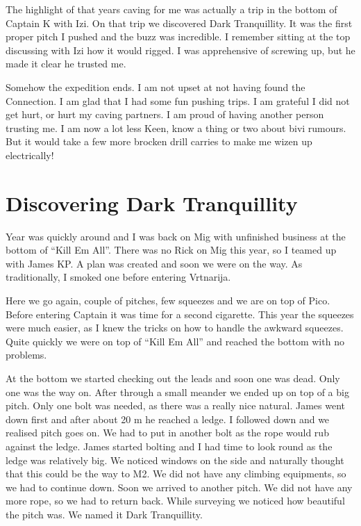 The highlight of that years caving for me was actually a trip in the
bottom of Captain K with Izi. On that trip we discovered Dark
Tranquillity. It was the first proper pitch I pushed and the buzz was
incredible. I remember sitting at the top discussing with Izi how it
would rigged. I was apprehensive of screwing up, but he made it clear he
trusted me.

Somehow the expedition ends. I am not upset at not having found the
Connection. I am glad that I had some fun pushing trips. I am grateful I
did not get hurt, or hurt my caving partners. I am proud of having
another person trusting me. I am now a lot less Keen, know a thing or
two about bivi rumours. But it would take a few more brocken drill
carries to make me wizen up electrically!


\section{Discovering Dark
Tranquillity}\label{discovering-dark-tranquillity}

Year was quickly around and I was back on Mig with unfinished business
at the bottom of ``Kill Em All''. There was no Rick on Mig this year, so
I teamed up with James KP. A plan was created and soon we were on the
way. As traditionally, I smoked one before entering Vrtnarija.

Here we go again, couple of pitches, few squeezes and we are on top of
Pico. Before entering Captain it was time for a second cigarette. This
year the squeezes were much easier, as I knew the tricks on how to
handle the awkward squeezes. Quite quickly we were on top of ``Kill Em
All'' and reached the bottom with no problems.

At the bottom we started checking out the leads and soon one was dead.
Only one was the way on. After through a small meander we ended up on
top of a big pitch. Only one bolt was needed, as there was a really nice
natural. James went down first and after about 20 m he reached a ledge.
I followed down and we realised pitch goes on. We had to put in another
bolt as the rope would rub against the ledge. James started bolting and
I had time to look round as the ledge was relatively big. We noticed
windows on the side and naturally thought that this could be the way to
M2. We did not have any climbing equipments, so we had to continue down.
Soon we arrived to another pitch. We did not have any more rope, so we
had to return back. While surveying we noticed how beautiful the pitch
was. We named it Dark Tranquillity.

